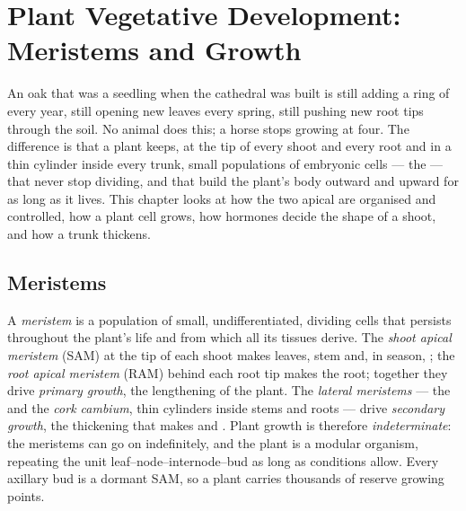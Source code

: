 \chapter{Plant Vegetative Development: Meristems and Growth}\label{ch:b2:plant-meristems}

An oak that was a seedling when the cathedral was built is still
adding a ring of  every year, still opening new leaves every
spring, still pushing new root tips through the soil. No animal does
this; a horse stops growing at four. The difference is that a plant
keeps, at the tip of every shoot and every root and in a thin
cylinder inside every trunk, small populations of embryonic cells
--- the \emph{} --- that never stop dividing, and that build
the plant's body outward and upward for as long as it lives. This
chapter looks at how the two apical  are organised and
controlled, how a plant cell grows, how hormones decide the shape of
a shoot, and how a trunk thickens.

\section{Meristems}

\begin{definition}\label{def:b2:plant-meristems:meristem}
A \emph{meristem} is a population of small, undifferentiated,
dividing cells that persists throughout the plant's life and from
which all its tissues derive. The \emph{shoot apical meristem} (SAM)
at the tip of each shoot makes leaves, stem and, in season, ;
the \emph{root apical meristem} (RAM) behind each root tip makes the
root; together they drive \emph{primary growth}, the lengthening of
the plant. The \emph{lateral meristems} --- the \emph{} and the \emph{cork cambium}, thin cylinders inside stems
and roots --- drive \emph{secondary growth}, the thickening that
makes  and . Plant growth is therefore \emph{indeterminate}:
the meristems can go on indefinitely, and the plant is a modular
organism, repeating the unit leaf--node--internode--bud as long as
conditions allow. Every axillary bud is a dormant SAM, so a plant
carries thousands of reserve growing points.
\end{definition}

